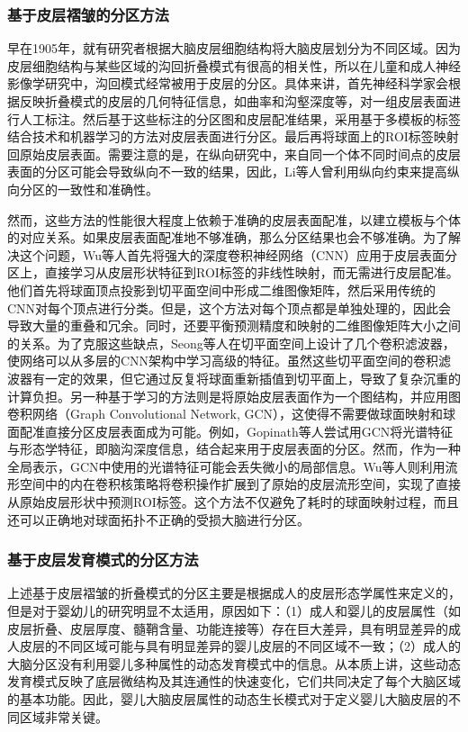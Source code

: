 \subsubsection{基于皮层褶皱的分区方法}
早在1905年，就有研究者根据大脑皮层细胞结构将大脑皮层划分为不同区域。因为皮层细胞结构与某些区域的沟回折叠模式有很高的相关性，所以在儿童和成人神经影像学研究中，沟回模式经常被用于皮层的分区。具体来讲，首先神经科学家会根据反映折叠模式的皮层的几何特征信息，如曲率和沟壑深度等，对一组皮层表面进行人工标注。然后基于这些标注的分区图和皮层配准结果，采用基于多模板的标签结合技术和机器学习的方法对皮层表面进行分区。最后再将球面上的ROI标签映射回原始皮层表面\cite{yeo2009spherical,desikan2006automated}。需要注意的是，在纵向研究中，来自同一个体不同时间点的皮层表面的分区可能会导致纵向不一致的结果，因此，Li等人\cite{li2014simultaneous}曾利用纵向约束来提高纵向分区的一致性和准确性。

然而，这些方法的性能很大程度上依赖于准确的皮层表面配准，以建立模板与个体的对应关系。如果皮层表面配准地不够准确，那么分区结果也会不够准确。为了解决这个问题，Wu等人\cite{wu2018registration}首先将强大的深度卷积神经网络（CNN）应用于皮层表面分区上，直接学习从皮层形状特征到ROI标签的非线性映射，而无需进行皮层配准。他们首先将球面顶点投影到切平面空间中形成二维图像矩阵，然后采用传统的CNN对每个顶点进行分类。但是，这个方法对每个顶点都是单独处理的，因此会导致大量的重叠和冗余。同时，还要平衡预测精度和映射的二维图像矩阵大小之间的关系。为了克服这些缺点，Seong等人\cite{seong2018geometric}在切平面空间上设计了几个卷积滤波器，使网络可以从多层的CNN架构中学习高级的特征。虽然这些切平面空间的卷积滤波器有一定的效果，但它通过反复将球面重新插值到切平面上，导致了复杂沉重的计算负担。另一种基于学习的方法则是将原始皮层表面作为一个图结构，并应用图卷积网络（Graph Convolutional Network, GCN）\cite{monti2017geometric}，这使得不需要做球面映射和球面配准直接分区皮层表面成为可能。例如，Gopinath等人\cite{gopinath2019graph}尝试用GCN将光谱特征与形态学特征，即脑沟深度信息，结合起来用于皮层表面的分区。然而，作为一种全局表示，GCN中使用的光谱特征可能会丢失微小的局部信息。Wu等人\cite{wu2019intrinsic}则利用流形空间中的内在卷积核策略将卷积操作扩展到了原始的皮层流形空间，实现了直接从原始皮层形状中预测ROI标签。这个方法不仅避免了耗时的球面映射过程，而且还可以正确地对球面拓扑不正确的受损大脑进行分区。


\subsubsection{基于皮层发育模式的分区方法}
上述基于皮层褶皱的折叠模式的分区主要是根据成人的皮层形态学属性来定义的，但是对于婴幼儿的研究明显不太适用，原因如下：（1）成人和婴儿的皮层属性（如皮层折叠、皮层厚度、髓鞘含量、功能连接等）存在巨大差异，具有明显差异的成人皮层的不同区域可能与具有明显差异的婴儿皮层的不同区域不一致；（2）成人的大脑分区没有利用婴儿多种属性的动态发育模式中的信息。从本质上讲，这些动态发育模式反映了底层微结构及其连通性的快速变化，它们共同决定了每个大脑区域的基本功能。因此，婴儿大脑皮层属性的动态生长模式对于定义婴儿大脑皮层的不同区域非常关键。

